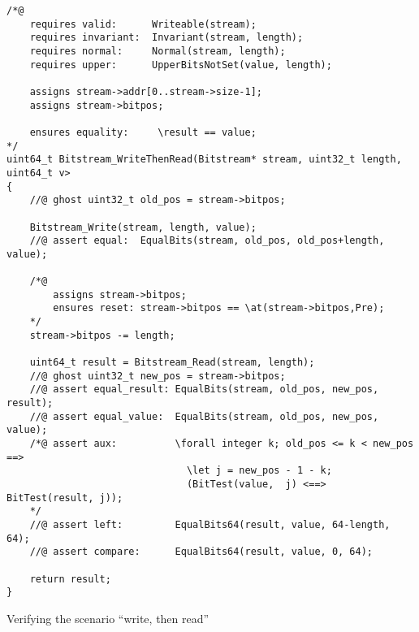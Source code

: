 \begin{listing}[hbt]
\begin{minipage}{0.99\textwidth}
\begin{lstlisting}[style=acsl-block]
/*@
    requires valid:      Writeable(stream);
    requires invariant:  Invariant(stream, length);
    requires normal:     Normal(stream, length);
    requires upper:      UpperBitsNotSet(value, length);

    assigns stream->addr[0..stream->size-1];
    assigns stream->bitpos;

    ensures equality:     \result == value;
*/
uint64_t Bitstream_WriteThenRead(Bitstream* stream, uint32_t length, uint64_t v>
{
    //@ ghost uint32_t old_pos = stream->bitpos;

    Bitstream_Write(stream, length, value);
    //@ assert equal:  EqualBits(stream, old_pos, old_pos+length, value);

    /*@ 
        assigns stream->bitpos;
        ensures reset: stream->bitpos == \at(stream->bitpos,Pre);
    */
    stream->bitpos -= length;

    uint64_t result = Bitstream_Read(stream, length);
    //@ ghost uint32_t new_pos = stream->bitpos;
    //@ assert equal_result: EqualBits(stream, old_pos, new_pos, result);
    //@ assert equal_value:  EqualBits(stream, old_pos, new_pos, value);
    /*@ assert aux:          \forall integer k; old_pos <= k < new_pos ==>
                               \let j = new_pos - 1 - k;
                               (BitTest(value,  j) <==> BitTest(result, j));
    */
    //@ assert left:         EqualBits64(result, value, 64-length, 64);
    //@ assert compare:      EqualBits64(result, value, 0, 64);

    return result;
}
\end{lstlisting}
\end{minipage}
\caption{\label{lst:Bitstream_WriteThenRead}
	Verifying the scenario ``write, then read'' }
\end{listing}

\FloatBarrier

